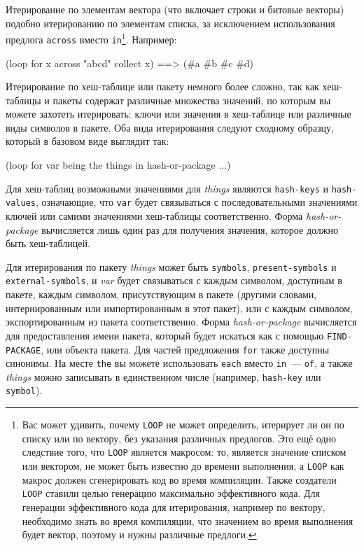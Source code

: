 Итерирование по элементам вектора (что включает строки и битовые векторы) подобно
итерированию по элементам списка, за исключением использования предлога \lstinline{across}
вместо \lstinline{in}\footnote{Вас может удивить, почему \lstinline{LOOP} не может определить,
  итерирует ли он по списку или по вектору, без указания различных предлогов. Это ещё одно
  следствие того, что \lstinline{LOOP} является макросом: то, является значение списком или
  вектором, не может быть известно до времени выполнения, а \lstinline{LOOP} как макрос
  должен сгенерировать код во время компиляции. Также создатели \lstinline{LOOP} ставили
  целью генерацию максимально эффективного кода. Для генерации эффективного кода для
  итерирования, например по вектору, необходимо знать во время компиляции, что значением
  во время выполнения будет вектор, поэтому и нужны различные предлоги.}\hspace{\footnotenegspace}. Например:

\begin{myverb}
(loop for x across "abcd" collect x) ==> (#\bslash{}a #\bslash{}b #\bslash{}c #\bslash{}d)
\end{myverb}

Итерирование по хеш-таблице или пакету немного более сложно, так как хеш-таблицы и пакеты
содержат различные множества значений, по которым вы можете захотеть итерировать: ключи
или значения в хеш-таблице или различные виды символов в пакете. Оба вида итерирования
следуют сходному образцу, который в базовом виде выглядит так:

\begin{myverb}
(loop for var being the things in hash-or-package ...)
\end{myverb}

Для хеш-таблиц возможными значениями для \textit{things} являются \lstinline{hash-keys} и
\lstinline{hash-values}, означающие, что \lstinline{var} будет связываться с последовательными
значениями ключей или самими значениями хеш-таблицы соответственно. Форма
\textit{hash-or-package} вычисляется лишь один раз для получения значения, которое должно
быть хеш-таблицей.

Для итерирования по пакету \textit{things} может быть \lstinline{symbols},
\lstinline{present-symbols} и \lstinline{external-symbols}, и \textit{var} будет связываться с
каждым символом, доступным в пакете, каждым символом, присутствующим в пакете (другими
словами, интернированным или импортированным в этот пакет), или с каждым символом,
экспортированным из пакета соответственно. Форма \textit{hash-or-package} вычисляется для
предоставления имени пакета, который будет искаться как с помощью \lstinline{FIND-PACKAGE},
или объекта пакета. Для частей предложения \lstinline{for} также доступны синонимы. На месте
\lstinline{the} вы можете использовать \lstinline{each} вместо \lstinline{in}~--- \lstinline{of}, а также
\textit{things} можно записывать в единственном числе (например, \lstinline{hash-key} или
\lstinline{symbol}).

